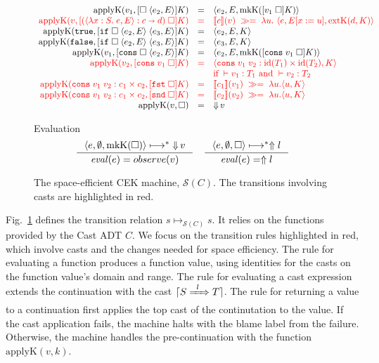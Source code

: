 \documentclass[runningheads]{llncs}
\newcommand{\infr}[2]{\inference{#1}{#2}}
\newcommand{\highlight}[1]{{\color{red} #1}}
\newcommand{\sidecond}[1]{\text{if}\;#1}
\newcommand{\figequalto}[3]{#1 & = & #2 & #3 \\}
\newcommand{\figequaltoH}[3]{\highlight{#1} & \highlight{=} & \highlight{#2} & 
\highlight{#3} \\}
\newcommand{\figref}[1]{Fig.~\ref{#1}}
\newcommand{\SMachine}[1]{\ensuremath{\mathcal{S}(#1)}}
\newcommand{\error}[1]{\ensuremath{\Uparrow#1}}
\newcommand{\Pfunc}[2]{\ensuremath{#1 \shortrightarrow #2}}
\newcommand{\Pprod}[2]{\ensuremath{#1 \times #2}}
\newcommand{\elam}[3]{\lambda#1:#2.\;#3}
\newcommand{\eapp}[2]{#1\;#2}
\newcommand{\eif}[3]{\mathtt{if}\;#1\;#2\;#3}
\newcommand{\econs}[2]{\mathtt{cons} \; #1 \; #2}
\newcommand{\efst}[1]{\mathtt{fst} \; #1}
\newcommand{\esnd}[1]{\mathtt{snd} \; #1}
\newcommand{\ecast}[2]{\ensuremath{#1 : #2}}
\newcommand{\ccast}[3]{#1 \xRightarrow[]{\enskip #2 \enskip} #3}
\newcommand{\vtrue}[0]{\mathtt{true}}
\newcommand{\vfalse}[0]{\mathtt{false}}
\newcommand{\vfunc}[4]{\langle\elam{#1}{#2}{#3},#4\rangle}
\newcommand{\vcons}[2]{\econs{#1}{#2}}
\newcommand{\sexpr}[3]{\ensuremath{\langle#1,#2,#3\rangle}}
\newcommand{\scont}[2]{\ensuremath{\langle#1,#2\rangle}}
\newcommand{\shalt}[1]{\ensuremath{\mathop{\Downarrow} #1}}
\newcommand{\Knil}[0]{\Box}
\newcommand{\Kcons}[2]{[#1]#2}
\newcommand{\closure}[2]{\langle#1,#2\rangle}
\newcommand{\FappXO}[2]{\eapp{\square}{\closure{#1}{#2}}}
\newcommand{\FappOX}[1]{\eapp{#1}{\square}}
\newcommand{\Fif}[3]{\eif{\square}{\closure{#1}{#3}}{\closure{#2}{#3}}}
\newcommand{\FconsXO}[2]{\econs{\square}{\closure{#1}{#2}}}
\newcommand{\FconsOX}[1]{\econs{#1}{\square}}
\newcommand{\Ffst}[0]{\efst{\square}}
\newcommand{\Fsnd}[0]{\esnd{\square}}
\newcommand{\mbind}[0]{\ensuremath{\;\gg=\;}}
\newcommand{\denote}[1]{\ensuremath{\llbracket #1 \rrbracket}}
\newcommand{\translate}[1]{\ensuremath{\lceil#1\rceil}}
\newcommand{\id}[1]{\ensuremath{\mathrm{id}(#1)}}
\newcommand{\mkContName}[0]{\ensuremath{\mathrm{mkK}}}
\newcommand{\mkCont}[1]{\ensuremath{\mkContName(#1)}}
\newcommand{\extContName}[0]{\ensuremath{\mathrm{extK}}}
\newcommand{\extCont}[2]{\ensuremath{\extContName(#1,#2)}}
\newcommand{\applyContName}[0]{\ensuremath{\mathrm{applyK}}}
\newcommand{\applyCont}[2]{\ensuremath{\applyContName(#1,#2)}}
\newcommand{\valuetyping}[2]{\ensuremath{\vdash #1 : #2}}
\newcommand{\casttyping}[3]{\ensuremath{\vdash #1 : #2 \Longrightarrow #3}}
\newcommand{\transitivelyreduceto}[2]{\ensuremath{#1 \longmapsto^{*} #2}}
\newcommand{\reducetoS}[3]{\ensuremath{#2 \longmapsto_{\SMachine{#1}} #3}}
\newcommand{\evalto}[2]{\ensuremath{\mathit{eval}(#1)=#2}}
\begin{document}
\begin{figure}[tp]
	\fbox{$\applyCont{v}{k}=s$}
	\[
	\begin{array}{rclr}
	\figequalto{\applyCont{v_1}{\Kcons{\FappXO{e_2}{E}}{K}}}{\sexpr{e_2}{E}{
			\mkCont{\Kcons{\FappOX{v_1}}{K}}}
	}{}
	\figequaltoH{
		\applyCont{v}{\Kcons{\FappOX{(\ecast{\vfunc{x}{S}{e}{E}}{\Pfunc{c}{d}})}}{K}}
	}{
		\denote{c}(v) \mbind \lambda u. \
		\sexpr{e}{E[x:=u]}{\extCont{d}{K}}
	}{}
	\figequalto{\applyCont{\vtrue}{\Kcons{\Fif{e_2}{e_3}{E}}{K}}}{\sexpr{e_2}{E}{K}}{}
	\figequalto{\applyCont{\vfalse}{\Kcons{\Fif{e_2}{e_3}{E}}{K}}}{\sexpr{e_3}{E}{K}}{}
	\figequalto{\applyCont{v_1}{\Kcons{\FconsXO{e_2}{E}}{K}}}{
		\sexpr{e_2}{E}{\mkCont{\Kcons{\FconsOX{v_1}}{K}}}
	}{}
	\figequaltoH{\applyCont{v_2}{\Kcons{\FconsOX{v_1}}{K}}}{
		\scont{\ecast{\vcons{v_1}{v_2}}{\Pprod{\id{T_1}}{\id{T_2}}}}{K}
	}{}
	& & 
	\highlight{\sidecond{
		\valuetyping{v_1}{T_1}
		\text{ and }
		\valuetyping{v_2}{T_2}
	}}
	\\
	\figequaltoH{
		\applyCont{\ecast{\vcons{v_1}{v_2}}{\Pprod{c_1}{c_2}}}{\Kcons{\Ffst}{K}}
	}{
		\denote{c_1}(v_1) \mbind \lambda u.
		\scont{u}{K}
	}{}
	\figequaltoH{
		\applyCont{\ecast{\vcons{v_1}{v_2}}{\Pprod{c_1}{c_2}}}{\Kcons{\Fsnd}{K}}
	}{
		\denote{c_2}(v_2) \mbind \lambda u.
		\scont{u}{K}
	}{}
	\figequalto{\applyCont{v}{\Knil}}{\shalt{v}}{}
	\end{array}
	\]
	
	\fbox{\evalto{e}{o}} Evaluation
	\[
	\inference{
		\transitivelyreduceto{\sexpr{e}{\emptyset}{\mkCont{\Knil}}}{\shalt{v}}
	}{
		\evalto{e}{observe(v)}
	} \quad
	\infr{
		\transitivelyreduceto{\sexpr{e}{\emptyset}{\Knil}}{\error{l}}
	}{
		\evalto{e}{\error{l}}}
	\]
	\caption{The space-efficient CEK machine, \SMachine{C}.
          The transitions involving casts are highlighted in red.}
	\label{fig:semachine-dynamics}
\end{figure}

\figref{fig:semachine-dynamics} defines the transition relation
$\reducetoS{C}{s}{s}$. It relies on the functions provided by the Cast
ADT $C$.
%
We focus on the transition rules highlighted in red, which involve
casts and the changes needed for space efficiency.
%
The rule for evaluating a function produces a function value, using
identities for the casts on the function value's domain and range.
%
The rule for evaluating a cast expression extends the continuation
with the cast \translate{\ccast{S}{l}{T}}.
%
The rule for returning a value to a continuation first applies the top
cast of the continutation to the value. If the cast application fails,
the machine halts with the blame label from the failure. Otherwise,
the machine handles the pre-continuation with the function
$\applyCont{v}{k}$.
\end{document}
